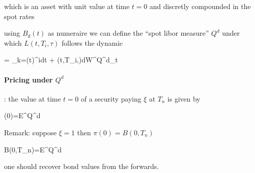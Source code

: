 which is an asset with unit value at time $t=0$ and discretly compounded in the spot rates

using $B_d(t)$ as numeraire we can define the ``spot libor measure'' $Q^d$ under which  $L(t,T_i,\tau)$ follows the dynamic

\ban
{}= \sum_{k=\eta(t)}^{i}dt + \gamma(t,T_i,\tau)dW^{Q^d}_t
\ean


\paragraph{ Pricing under $Q^d$}: the value at time $t=0$ of a security paying $\xi$ at $T_n$ is given by

\ban
\pi(0)=E^{Q^d}
\ean

Remark: suppose $\xi=1$ then $\pi(0)=B(0,T_n)$

\ban
B(0,T_n)=E^{Q^d}\left[ \prod_{i=0}^{n-1}\frac{1}{(1+\tau L(T_i,T_i,\tau))} \right]
\ean

one should recover bond values from the forwards.
